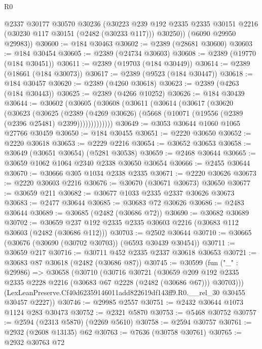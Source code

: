 \begin{lexlean}{R0}
\begin{coremodule}
        @2337
        @30177
        @30570
        @30236
        (@30223
          @239
          @192
          @2335
          @2335
          @30151
          @2216
          (@30230 @117 @30151 (@2482 (@30233 @117)))
          @30250))
      (@6090 @29950 @29983))
@30600 := @184 @30463
@30602 := @2389 (@28681 @30600)
@30603 := @184 @30454
@30605 := @2389 (@24734 @30603)
@30608 := @2389 (@19770 (@184 @30451))
@30611 := @2389 (@19703 (@184 @30449))
@30614 := @2389 (@18661 (@184 @30073))
@30617 := @2389 (@9523 (@184 @30447))
@30618 := @184 @30457
@30620 := @2389 (@4260 @30618)
@30623 := @2389 (@4263 (@184 @30443))
@30625 := @2389 (@4266 @10252)
@30626 := @184 @30439
@30644 := @30602
    (@30605
      (@30608
        (@30611
          (@30614
            (@30617
              (@30620
                (@30623
                  (@30625
                    (@2389
                      (@4269 @30626)
                      (@5668 (@10071 (@19556 (@2389 (@2396 @25481) @2399)))))))))))))
@30649 := @3053 @30644 @1060 @1065 @27766 @30459
@30650 := @184 @30455
@30651 := @2220 @30650
@30652 := @2220 @30618
@30653 := @2229 @2216
@30654 := @30652 @30653
@30658 := @30649 (@30651 @30654) (@5281 @30538)
@30659 := @2468 @30644
@30665 := @30659 @1062 @1064 @2340 @2338 @30650 @30654
@30666 := @2455 @30644
@30670 := @30666 @305 @1034 @2338 @2335
@30671 := @2220 @30626
@30673 := @2220 @30603 @2216
@30676 := @30670 (@30671 @30673) @30650
@30677 := @30659 @211
@30682 := @30677 @1033 @2335 @2337 @30626 @30673
@30683 := @2477 @30644
@30685 := @30683 @72 @30626
@30686 := @2483 @30644
@30689 := @30685 (@2482 (@30686 @72))
@30690 := @30682 @30689
@30702 := @30659 @237 @192 @2335 @2335 @30603 @2216 (@30683 @112 @30603 (@2482 (@30686 @112)))
@30703 := @2502 @30644
@30710 := @30665 (@30676 (@30690 (@30702 @30703)) (@6593 @30439 @30454))
@30711 := @30659 @217
@30716 := @30711 @452 @2335 @2337 @30618 @30653
@30721 := @30683 @87 @30618 (@2482 (@30686 @87))
@30745 := @30599
    (fun ("_" : @29986) =>
    @30658
      (@30710
        (@30716
          @30721
          (@30659
            @209
            @192
            @2335
            @2335
            @2228
            @2216
            (@30683 @67 @2228 (@2482 (@30686 @67)))
            @30703)))
      (LexLeanPreserve.Cf40d62359146011add822619df143ff9.R0.__rel_30 @30455 @30457 @2227))
@30746 := @29985 @2557
@30751 := @2432 @30644 @1073 @1124 @283 @30473
@30752 := @2321 @5870
@30753 := @5468 @30752
@30757 := @2594 (@2313 @5870) (@2269 @5610)
@30758 := @2594 @30757
@30761 := @2932 (@2608 @13135) @62
@30763 := @7636 (@30758 @30761)
@30765 := @2932 @30763 @72

\end{coremodule}
\end{lexlean}
